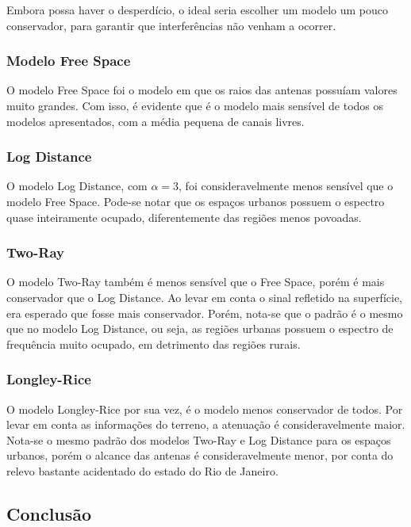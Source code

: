 Embora possa haver o desperdício, o ideal seria escolher um modelo um pouco conservador, para garantir que interferências não venham a ocorrer.

\subsubsection{Modelo Free Space}

O modelo Free Space foi o modelo em que os raios das antenas possuíam valores muito grandes. Com isso, é evidente que é o modelo mais sensível de todos os modelos apresentados, com a média pequena de canais livres.

\subsubsection{Log Distance}

O modelo Log Distance, com \begin{math}\alpha = 3 \end{math}, foi consideravelmente menos sensível que o modelo Free Space. Pode-se notar que os espaços urbanos possuem o espectro quase inteiramente ocupado, diferentemente das regiões menos povoadas.

\subsubsection{Two-Ray}

O modelo Two-Ray também é menos sensível que o Free Space, porém é mais conservador que o Log Distance. Ao levar em conta o sinal refletido na superfície, era esperado que fosse mais conservador. Porém, nota-se que o padrão é o mesmo que no modelo Log Distance, ou seja, as regiões urbanas possuem o espectro de frequência muito ocupado, em detrimento das regiões rurais.

\subsubsection{Longley-Rice}

O modelo Longley-Rice por sua vez, é o modelo menos conservador de todos. Por levar em conta as informações do terreno, a atenuação é consideravelmente maior. Nota-se o mesmo padrão dos modelos Two-Ray e Log Distance para os espaços urbanos, porém o alcance das antenas é consideravelmente menor, por conta do relevo bastante acidentado do estado do Rio de Janeiro.

\subsection{Conclusão}

